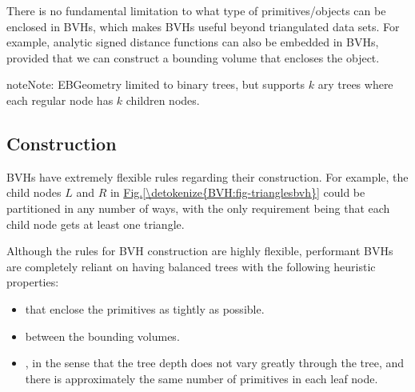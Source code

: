 \documentclass[letterpaper,10pt,english]{sphinxmanual}
\begin{document}
\sphinxAtStartPar
There is no fundamental limitation to what type of primitives/objects can be enclosed in BVHs, which makes BVHs useful beyond triangulated data sets.
For example, analytic signed distance functions can also be embedded in BVHs, provided that we can construct a bounding volume that encloses the object.

\begin{sphinxadmonition}{note}{Note:}
\sphinxAtStartPar
EBGeometry limited to binary trees, but supports \(k\) \sphinxhyphen{}ary trees where each regular node has \(k\) children nodes.
\end{sphinxadmonition}


\subsection{Construction}
\label{\detokenize{BVH:construction}}
\sphinxAtStartPar
BVHs have extremely flexible rules regarding their construction.
For example, the child nodes \(L\) and \(R\) in \hyperref[\detokenize{BVH:fig-trianglesbvh}]{Fig.\@ \ref{\detokenize{BVH:fig-trianglesbvh}}} could be partitioned in any number of ways, with the only requirement being that each child node gets at least one triangle.

\sphinxAtStartPar
Although the rules for BVH construction are highly flexible, performant BVHs are completely reliant on having balanced trees with the following heuristic properties:
\begin{itemize}
\item {} 
\sphinxAtStartPar
{} that enclose the primitives as tightly as possible.

\item {} 
\sphinxAtStartPar
{} between the bounding volumes.

\item {} 
\sphinxAtStartPar
{}, in the sense that the tree depth does not vary greatly through the tree, and there is approximately the same number of primitives in each leaf node.

\end{itemize}
\end{document}
